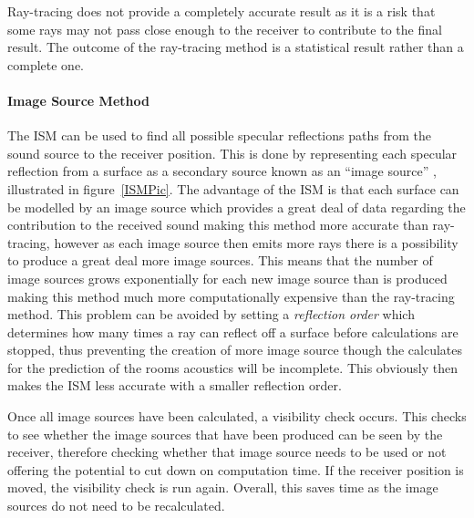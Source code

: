 \documentclass[../../main.tex]{subfiles}
\begin{document}
			Ray-tracing does not provide a completely accurate result as it is a risk that some rays may not pass close enough to the receiver to contribute to the final result. The outcome of the ray-tracing method is a statistical result rather than a complete one.

		\paragraph{Image Source Method}


			The \ac{ISM} can be used to find all possible specular reflections paths from the sound source to the receiver position. This is done by representing each specular reflection from a surface as a secondary source known as an ``image source'' \cite{Rindel1995}, illustrated in figure~\ref{ISMPic}. The advantage of the \ac{ISM} is that each surface can be modelled by an image source which provides a great deal of data regarding the contribution to the received sound making this method more accurate than ray-tracing, however as each image source then emits more rays there is a possibility to produce a great deal more image sources. This means that the number of image sources grows exponentially for each new image source than is produced making this method much more computationally expensive than the ray-tracing method. This problem can be avoided by setting a \textit{reflection order} which determines how many times a ray can reflect off a surface before calculations are stopped, thus preventing the creation of more image source though the calculates for the prediction of the rooms acoustics will be incomplete. This obviously then makes the \ac{ISM} less accurate with a smaller reflection order.

			Once all image sources have been calculated, a visibility check occurs. This checks to see whether the image sources that have been produced can be seen by the receiver, therefore checking whether that image source needs to be used or not offering the potential to cut down on computation time. If the receiver position is moved, the visibility check is run again. Overall, this saves time as the image sources do not need to be recalculated.
\end{document}
